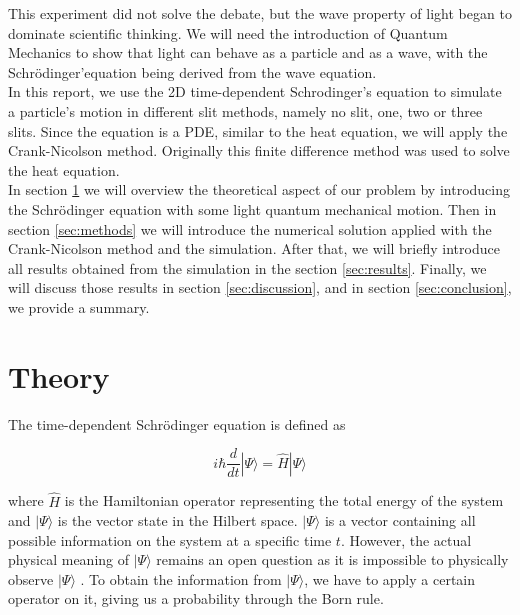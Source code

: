 \documentclass[english,notitlepage,reprint,nofootinbib]{revtex4-2}  %
\begin{document}
	This experiment did not solve the debate, but the wave property of light began to dominate
	scientific thinking. We will need the introduction of Quantum Mechanics to show that
	light can behave as a particle and as a wave, with the Schrödinger'equation being derived
	from the wave equation. \\

	In this report, we use the 2D time-dependent Schrodinger's equation to simulate a particle's
	motion in different slit methods, namely no slit, one, two or three slits. Since the equation is a PDE, similar to the heat equation, we will apply the Crank-Nicolson method.
Originally this finite difference method was used to solve the heat equation\cite{Crank1947APM}. \\

	In section \ref{sec:theory} we will overview the theoretical aspect of our problem by introducing
	the Schrödinger equation with some light quantum mechanical motion. Then in section \ref{sec:methods}
	we will introduce the numerical solution applied with the Crank-Nicolson method and the simulation. After that, we will briefly introduce all results obtained from the simulation in the section
	\ref{sec:results}. Finally, we will discuss those results in section \ref{sec:discussion}, and
	in section  \ref{sec:conclusion}, we provide a summary.

	\section{Theory} \label{sec:theory}
	The time-dependent Schrödinger equation is defined as

	\begin{equation}
	i \hbar \frac{d}{d t}|\Psi\rangle=\hat{H}|\Psi\rangle \label{eq:schro_eq}
	\end{equation}

	where $\hat{H}$ is the Hamiltonian operator representing the total energy of the system
	and $|\Psi\rangle$ is the vector state in the Hilbert space. $|\Psi\rangle$ is a vector
	containing all possible information on the system at a specific time $t$. However, the actual physical meaning of $|\Psi\rangle$ remains an open question as it is impossible to
	physically observe $|\Psi\rangle$ \cite{griffiths:quantumn}. To obtain the information
	from $|\Psi\rangle$, we have to apply a certain operator on it, giving us a probability
	through the Born rule.\\
\end{document}
